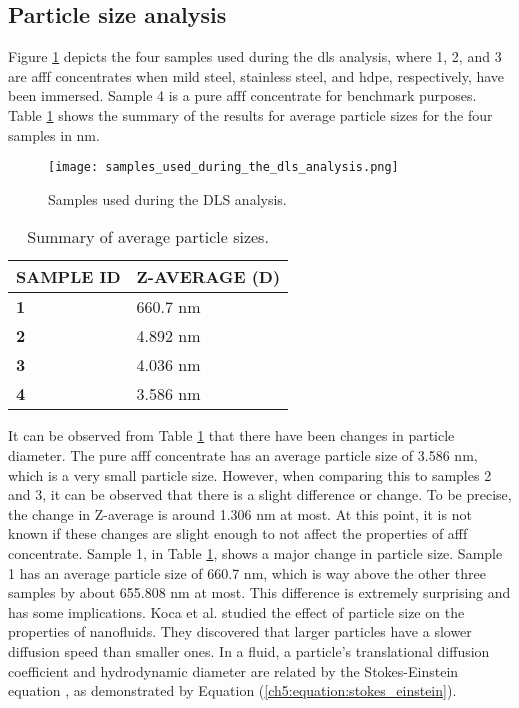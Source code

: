 \subsection{Particle size analysis}
\label{ch5:anchor:section:size_analysis}

Figure \ref{ch5:figure:samples} depicts the four samples used during the \acrshort{dls} analysis, where 1, 2, and 3 are \acrshort{afff} concentrates when mild steel, stainless steel, and \acrshort{hdpe}, respectively, have been immersed. Sample 4 is a pure \acrshort{afff} concentrate for benchmark purposes. Table \ref{ch5:table:sizes} shows the summary of the results for average particle sizes for the four samples in nm.
  
\begin{figure}[H]
    \centering
    \texttt{[image: samples\_used\_during\_the\_dls\_analysis.png]}
    \caption{Samples used during the DLS analysis.}
    \label{ch5:figure:samples}
\end{figure}

\begin{table}[H]
\renewcommand{\arraystretch}{2}

\caption{Summary of average particle sizes.}

\begin{tabularx}{\textwidth}{ XX }
\hline
\textbf{SAMPLE ID} & \textbf{Z-AVERAGE (D)} \\
\hline
\textbf{1} & 660.7 nm \\
\textbf{2} & 4.892 nm \\
\textbf{3} & 4.036 nm \\
\textbf{4} & 3.586 nm \\
\hline
\end{tabularx}

\label{ch5:table:sizes}
\end{table}

It can be observed from Table \ref{ch5:table:sizes} that there have been changes in particle diameter. The pure \acrshort{afff} concentrate has an average particle size of 3.586 nm, which is a very small particle size. However, when comparing this to samples 2 and 3, it can be observed that there is a slight difference or change. To be precise, the change in Z-average is around 1.306 nm at most. At this point, it is not known if these changes are slight enough to not affect the properties of \acrshort{afff} concentrate. Sample 1, in Table \ref{ch5:table:sizes}, shows a major change in particle size. Sample 1 has an average particle size of 660.7 nm, which is way above the other three samples by about 655.808 nm at most. This difference is extremely surprising and has some implications. Koca et al. \cite{koca2018effect} studied the effect of particle size on the properties of nanofluids. They discovered that larger particles have a slower diffusion speed than smaller ones. In a fluid, a particle's translational diffusion coefficient and hydrodynamic diameter are related by the Stokes-Einstein equation \cite{an2018effect}, as demonstrated by Equation (\ref{ch5:equation:stokes_einstein}).

